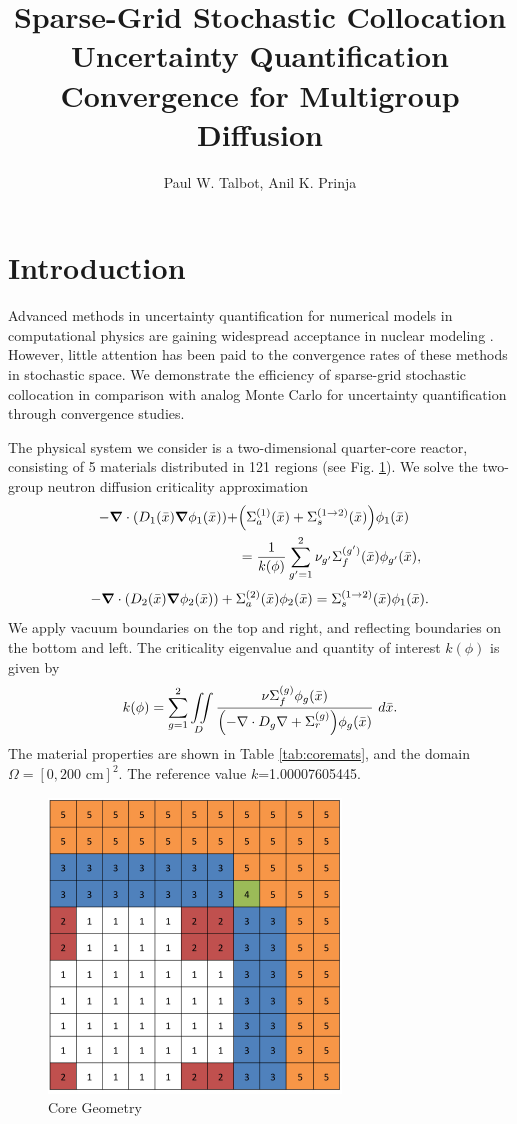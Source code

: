 \documentclass{anstrans}
\title{Sparse-Grid Stochastic Collocation Uncertainty Quantification Convergence for Multigroup Diffusion}
\author{Paul W. Talbot, Anil K. Prinja}
\institute{Department of Nuclear Engineering, University of New Mexico, Albuquerque, NM, 87131}
\newcommand{\xs}[2]{\ensuremath{\Sigma_{#1}^{(#2)}}}
\begin{document}
\section{Introduction}
Advanced methods in  uncertainty quantification for numerical models in computational physics \cite{SCLagrange}\cite{textbook} are gaining widespread acceptance in nuclear modeling \cite{erin01}\cite{mike01}.  However, little attention has been paid to the convergence rates of these methods in stochastic space.  We demonstrate the efficiency of sparse-grid stochastic collocation \cite{sparseSC} in comparison with analog Monte Carlo for uncertainty quantification through convergence studies.

The physical system we consider is a two-dimensional quarter-core reactor, consisting of 5 materials distributed in 121 regions (see Fig. \ref{geom}).  We solve the two-group neutron diffusion criticality approximation
\begin{align}
-\grad\cdot\qty( D_1(\bar x)\grad\phi_1(\bar x))+&\qty(\xs{a}{1}(\bar x)+\xs{s}{1\to2}(\bar x))\phi_1(\bar x) \nonumber\\
        &= \frac{1}{k(\phi)}\sum_{g'=1}^2\nu_{g'}\xs{f}{g'}(\bar x)\phi_{g'}(\bar x),
\end{align}
\begin{equation}
-\grad \cdot\qty(D_2(\bar x)\grad \phi_2(\bar x))+\xs{a}{2}(\bar x)\phi_2(\bar x) = \xs{s}{1\to 2}(\bar x)\phi_1(\bar x).
\end{equation}
We apply vacuum boundaries on the top and right, and reflecting boundaries on the bottom and left.
The criticality eigenvalue and quantity of interest $k(\phi)$ is given by
\begin{equation}
k(\phi)=\sum_{g=1}^2\iint\limits_D\frac{\nu\xs{f}{g}\phi_g(\bar x)}{\qty(-\nabla\cdot D_g\nabla+\Sigma_r^{(g)})\phi_g(\bar x)}~d\bar x.
\end{equation}
The material properties are shown in Table \ref{tab:coremats}, and the domain $\Omega=[0,200\text{ cm}]^2$.  The reference value $k$=1.00007605445.
\begin{figure}[H]
\centering
  \includegraphics[width=0.5\linewidth]{core}
  \caption{Core Geometry}
  \label{geom}
\end{figure}
\end{document}
